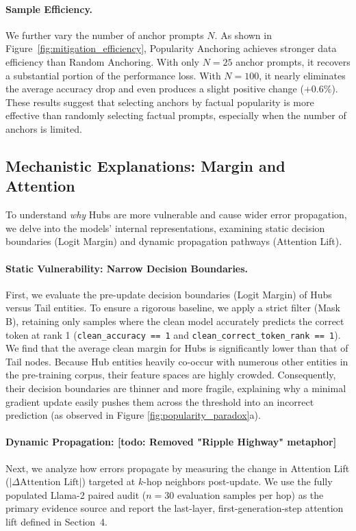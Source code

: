 \paragraph{Sample Efficiency.}
We further vary the number of anchor prompts $N$. As shown in Figure~\ref{fig:mitigation_efficiency}, Popularity Anchoring achieves stronger data efficiency than Random Anchoring. With only $N=25$ anchor prompts, it recovers a substantial portion of the performance loss. With $N=100$, it nearly eliminates the average accuracy drop and even produces a slight positive change ($+0.6\%$). These results suggest that selecting anchors by factual popularity is more effective than randomly selecting factual prompts, especially when the number of anchors is limited.


\subsection{Mechanistic Explanations: Margin and Attention}
\label{subsec:mechanisms}

To understand \textit{why} Hubs are more vulnerable and cause wider error propagation, we delve into the models' internal representations, examining static decision boundaries (Logit Margin) and dynamic propagation pathways (Attention Lift).

\paragraph{Static Vulnerability: Narrow Decision Boundaries.}
First, we evaluate the pre-update decision boundaries (Logit Margin) of Hubs versus Tail entities. To ensure a rigorous baseline, we apply a strict filter (Mask B), retaining only samples where the clean model accurately predicts the correct token at rank 1 (\texttt{clean\_accuracy == 1} and \texttt{clean\_correct\_token\_rank == 1}). We find that the average clean margin for Hubs is significantly lower than that of Tail nodes. Because Hub entities heavily co-occur with numerous other entities in the pre-training corpus, their feature spaces are highly crowded. Consequently, their decision boundaries are thinner and more fragile, explaining why a minimal gradient update easily pushes them across the threshold into an incorrect prediction (as observed in Figure \ref{fig:popularity_paradox}a).

\paragraph{Dynamic Propagation: [todo: Removed "Ripple Highway" metaphor]}
Next, we analyze how errors propagate by measuring the change in Attention Lift ($|\Delta \text{Attention Lift}|$) targeted at $k$-hop neighbors post-update. We use the fully populated Llama-2 paired audit ($n=30$ evaluation samples per hop) as the primary evidence source and report the last-layer, first-generation-step attention lift defined in Section~4.

